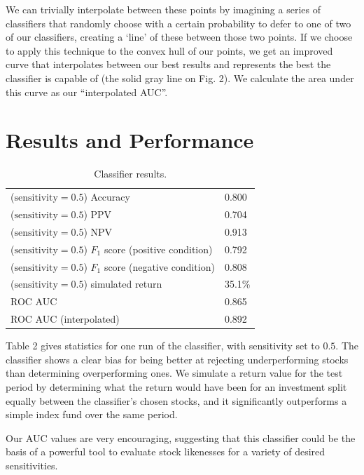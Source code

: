 \documentclass[format=acmlarge]{acmart}
\begin{document}
We can trivially interpolate between these points by imagining a series of classifiers that randomly choose with a certain probability to defer to one of two of our classifiers, creating a `line' of these between those two points.  If we choose to apply this technique to the convex hull of our points, we get an improved curve that interpolates between our best results and represents the best the classifier is capable of (the solid gray line on Fig. 2).  We calculate the area under this curve as our ``interpolated AUC''.

\section{Results and Performance}

\begin{table}
  \caption{Classifier results.}
  \label{tab:two}
  \begin{tabular}{l|l}
    ($\textrm{sensitivity} = 0.5$) Accuracy & 0.800\\
    ($\textrm{sensitivity} = 0.5$) PPV & 0.704\\
    ($\textrm{sensitivity} = 0.5$) NPV & 0.913\\
    ($\textrm{sensitivity} = 0.5$) $F_1$ score (positive condition) & 0.792\\
    ($\textrm{sensitivity} = 0.5$) $F_1$ score (negative condition) & 0.808\\
    ($\textrm{sensitivity} = 0.5$) simulated return & 35.1\%\\
    ROC AUC & 0.865\\
    ROC AUC (interpolated) & 0.892\\
  \end{tabular}
\end{table}

Table 2 gives statistics for one run of the classifier, with sensitivity set to $0.5$.  The classifier shows a clear bias for being better at rejecting underperforming stocks than determining overperforming ones.  We simulate a return value for the test period by determining what the return would have been for an investment split equally between the classifier's chosen stocks, and it significantly outperforms a simple index fund over the same period.

Our AUC values are very encouraging, suggesting that this classifier could be the basis of a powerful tool to evaluate stock likenesses for a variety of desired sensitivities.
\end{document}

